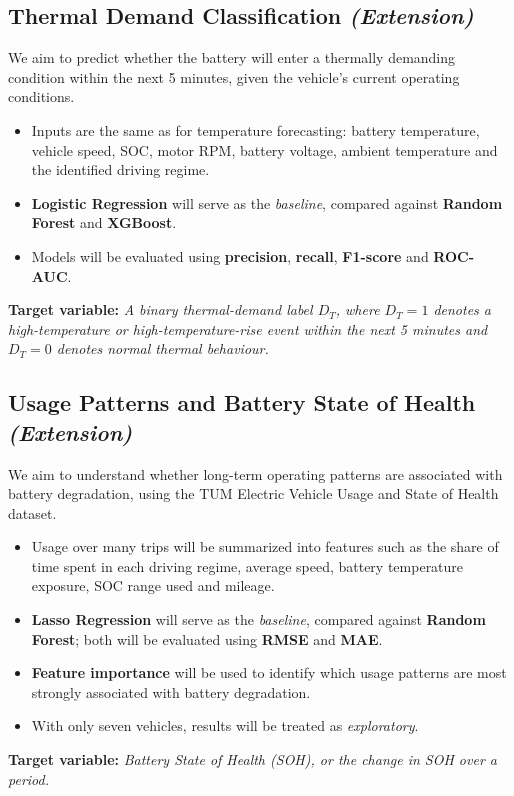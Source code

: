 \documentclass[11pt,letterpaper]{article}
\newcommand{\extn}{\textit{\textmd{(Extension)}}}
\newcommand{\target}[1]{\par\nopagebreak[4]\textbf{Target variable:} \textit{#1}\par}
\begin{document}
\subsection{Thermal Demand Classification \extn}\label{sp:4}
We aim to predict whether the battery will enter a thermally demanding condition within the next 5 minutes, given the vehicle's current operating conditions.
\begin{itemize}
  \item Inputs are the same as for temperature forecasting: battery temperature, vehicle speed, SOC, motor RPM, battery voltage, ambient temperature and the identified driving regime.
  \item \textbf{Logistic Regression} will serve as the \textit{baseline}, compared against \textbf{Random Forest} and \textbf{XGBoost}.
  \item Models will be evaluated using \textbf{precision}, \textbf{recall}, \textbf{F1-score} and \textbf{ROC-AUC}.
\end{itemize}
\target{A binary thermal-demand label $D_T$, where $D_T = 1$ denotes a high-temperature or high-temperature-rise event within the next 5 minutes and $D_T = 0$ denotes normal thermal behaviour.}

\subsection{Usage Patterns and Battery State of Health \extn}\label{sp:5}
We aim to understand whether long-term operating patterns are associated with battery degradation, using the TUM Electric Vehicle Usage and State of Health dataset.
\begin{itemize}
  \item Usage over many trips will be summarized into features such as the share of time spent in each driving regime, average speed, battery temperature exposure, SOC range used and mileage.
  \item \textbf{Lasso Regression} will serve as the \textit{baseline}, compared against \textbf{Random Forest}; both will be evaluated using \textbf{RMSE} and \textbf{MAE}.
  \item \textbf{Feature importance} will be used to identify which usage patterns are most strongly associated with battery degradation.
  \item With only seven vehicles, results will be treated as \textit{exploratory}.
\end{itemize}
\target{Battery State of Health (SOH), or the change in SOH over a period.}
\end{document}

